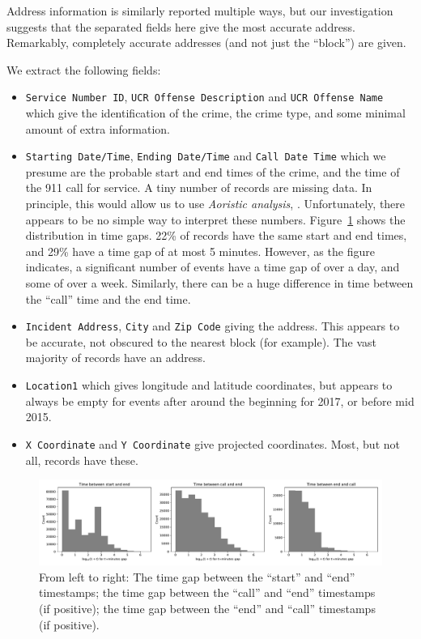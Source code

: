 \documentclass[twoside,a4paper,twocolumn,10pt]{article}
\theoremstyle{plain}
\theoremstyle{definition}
\begin{document}
Address information is similarly reported multiple ways, but our investigation
suggests that the separated fields here give the most accurate address.  Remarkably, completely accurate
addresses (and not just the ``block'') are given.

We extract the following fields:
\begin{itemize}
\item \texttt{Service Number ID}, \texttt{UCR Offense Description} and \texttt{UCR Offense Name}
  which give the identification of the crime, the crime type, and some minimal amount of extra information.
\item \texttt{Starting  Date/Time}, \texttt{Ending Date/Time} and \texttt{Call Date Time} which we presume
  are the probable start and end times of the crime, and the time of the 911 call for service.  A tiny number
  of records are missing data.  In principle, this would allow us to use \emph{Aoristic analysis}, \cite{ratcliffe}.
  Unfortunately, there appears to be no simple way to interpret these numbers.  Figure~\ref{fig:dallas_times}
  shows the distribution in time gaps.  22\% of records have the same start and end times, and 29\% have
  a time gap of at most 5 minutes.  However, as the figure indicates, a significant number of events have a time
  gap of over a day, and some of over a week.  Similarly, there can be a huge difference in time between
  the ``call'' time and the end time.
\item \texttt{Incident Address}, \texttt{City} and \texttt{Zip Code} giving the address.  This appears to
  be accurate, not obscured to the nearest block (for example).  The vast majority of records have an address.
\item \texttt{Location1} which gives longitude and latitude coordinates, but appears to always be empty for
  events after around the beginning for 2017, or before mid 2015.
\item \texttt{X Coordinate} and \texttt{Y Coordinate} give projected coordinates.  Most, but not all,
  records have these.
\end{itemize}

\begin{figure}
  \includegraphics[width=\textwidth]{dallas_times.pdf}
  \caption{From left to right: The time gap between the ``start'' and ``end'' timestamps;
  the time gap between the ``call'' and ``end'' timestamps (if positive);
  the time gap between the ``end'' and ``call'' timestamps (if positive).}
  \label{fig:dallas_times}
\end{figure}
\end{document}
